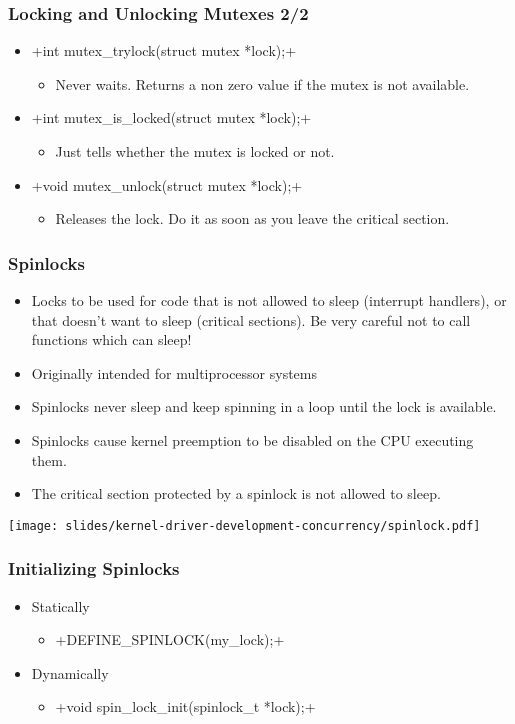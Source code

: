 \begin{frame}[fragile]
  \frametitle{Locking and Unlocking Mutexes 2/2}
  \begin{itemize}
  \item {}+int mutex_trylock(struct mutex *lock);+
    \begin{itemize}
    \item Never waits. Returns a non zero value if the mutex is not
      available.
    \end{itemize}
  \item {}+int mutex_is_locked(struct mutex *lock);+
    \begin{itemize}
    \item Just tells whether the mutex is locked or not.
    \end{itemize}
  \item {}+void mutex_unlock(struct mutex *lock);+
    \begin{itemize}
    \item Releases the lock. Do it as soon as you leave the critical
      section.
    \end{itemize}
  \end{itemize}
\end{frame}

\begin{frame}
  \frametitle{Spinlocks}
  \begin{itemize}
  \item Locks to be used for code that is not allowed to sleep
    (interrupt handlers), or that doesn't want to sleep (critical
    sections). Be very careful not to call functions which can sleep!
  \item Originally intended for multiprocessor systems
  \item Spinlocks never sleep and keep spinning in a loop until the
    lock is available.
  \item Spinlocks cause kernel preemption to be disabled on the CPU
    executing them.
  \item The critical section protected by a spinlock is not allowed to
    sleep.
  \end{itemize}
  \begin{center}
    \texttt{[image: slides/kernel-driver-development-concurrency/spinlock.pdf]}
  \end{center}
\end{frame}

\begin{frame}[fragile]
  \frametitle{Initializing Spinlocks}
  \begin{itemize}
  \item Statically
    \begin{itemize}
    \item {}+DEFINE_SPINLOCK(my_lock);+
    \end{itemize}
  \item Dynamically
    \begin{itemize}
    \item {}+void spin_lock_init(spinlock_t *lock);+
    \end{itemize}
  \end{itemize}
\end{frame}

